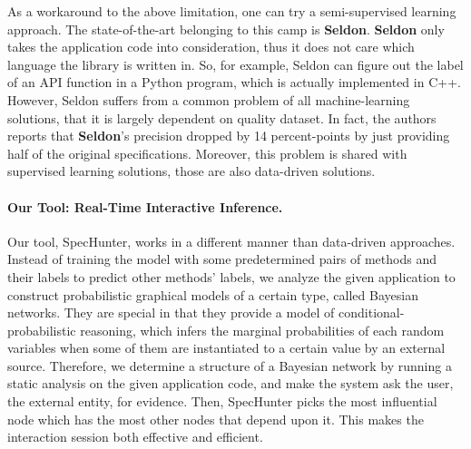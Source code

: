 \documentclass[acmsmall,review,anonymous]{acmart}\settopmatter{printfolios=true,printccs=false,printacmref=false}
\begin{document}
As a workaround to the above limitation, one can try a semi-supervised learning
approach. The state-of-the-art belonging to this camp is \textbf{Seldon}.
\textbf{Seldon} only takes the application code into consideration, thus it does
not care which language the library is written in. So, for example, Seldon can
figure out the label of an API function in a Python program, which is
actually implemented in C++. However, Seldon suffers from a common problem of
all machine-learning solutions, that it is largely dependent on quality dataset.
In fact, the authors reports that \textbf{Seldon}'s precision dropped by 14
percent-points by just providing half of the original specifications. Moreover,
this problem is shared with supervised learning solutions, those are also
data-driven solutions.

\paragraph{Our Tool: Real-Time Interactive Inference.}

Our tool, SpecHunter, works in a different manner than data-driven
approaches. Instead of training the model with some predetermined pairs of
methods and their labels to predict other methods' labels, we analyze the given
application to construct probabilistic graphical models of a certain type,
called Bayesian networks. They are special in that they provide a model of
conditional-probabilistic reasoning, which infers the marginal probabilities of
each random variables when some of them are instantiated to a certain value by
an external source. Therefore, we determine a structure of a Bayesian network by
running a static analysis on the given application code, and make the system ask
the user, the external entity, for evidence. Then, SpecHunter picks the most
influential node which has the most other nodes that depend upon it. This makes
the interaction session both effective and efficient.
\end{document}
